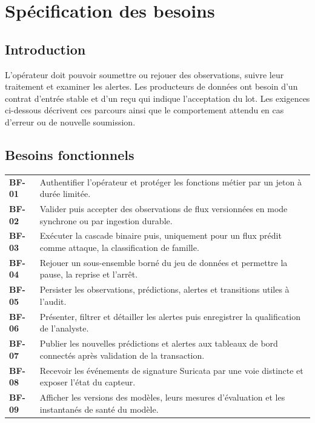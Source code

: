 \chapter{Sp\'ecification des besoins}
\label{chap:besoins}

\section{Introduction}

L'opérateur doit pouvoir soumettre ou rejouer des observations, suivre leur
traitement et examiner les alertes. Les producteurs de données ont besoin d'un
contrat d'entrée stable et d'un reçu qui indique l'acceptation du lot.
Les exigences ci-dessous décrivent ces parcours ainsi que le comportement
attendu en cas d'erreur ou de nouvelle soumission.

\noindent\begin{minipage}{\textwidth}
\section{Besoins fonctionnels}

\begin{center}
  \captionsetup{type=table}
  \label{tab:functional-requirements}
  \renewcommand{\arraystretch}{1.22}
  \begin{tabularx}{\textwidth}{@{}>{\bfseries\color{PremiumEmerald}}p{}Y@{}}
    BF-01 & Authentifier l'op\'erateur et prot\'eger les fonctions m\'etier par un jeton à dur\'ee limit\'ee. \\
    BF-02 & Valider puis accepter des observations de flux versionn\'ees en mode synchrone ou par ingestion durable. \\
    BF-03 & Ex\'ecuter la cascade binaire puis, uniquement pour un flux prédit comme attaque, la classification de famille. \\
    BF-04 & Rejouer un sous-ensemble born\'e du jeu de donn\'ees et permettre la pause, la reprise et l'arr\^et. \\
    BF-05 & Persister les observations, pr\'edictions, alertes et transitions utiles à l'audit. \\
    BF-06 & Pr\'esenter, filtrer et d\'etailler les alertes puis enregistrer la qualification de l'analyste. \\
    BF-07 & Publier les nouvelles pr\'edictions et alertes aux tableaux de bord connect\'es apr\`es validation de la transaction. \\
    BF-08 & Recevoir les \'ev\'enements de signature Suricata par une voie distincte et exposer l'\'etat du capteur. \\
    BF-09 & Afficher les versions des modèles, leurs mesures d'\'evaluation et les instantan\'es de sant\'e du mod\`ele. \\
  \end{tabularx}
\end{center}
\end{minipage}

